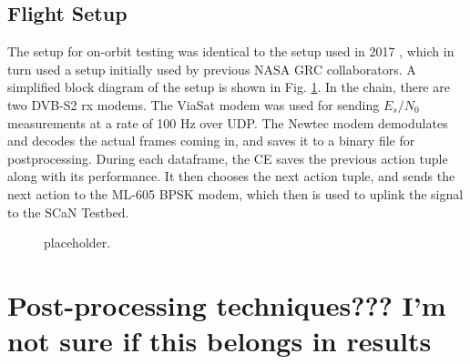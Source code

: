 \subsection{Flight Setup}
\par The setup for on-orbit testing was identical to the setup used in 2017 \cite{tim_implementation}, which in turn used a setup initially used by previous NASA GRC collaborators. A simplified block diagram of the setup is shown in Fig. \ref{methods:flightTestFig}. In the chain, there are two DVB-S2 rx modems. The ViaSat modem was used for sending $E_s/N_0$ measurements at a rate of 100 Hz over UDP. The Newtec modem demodulates and decodes the actual frames coming in, and saves it to a binary file for postprocessing. During each dataframe, the CE saves the previous action tuple along with its performance. It then chooses the next action tuple, and sends the next action to the ML-605 BPSK modem, which then is used to uplink the signal to the SCaN Testbed.

\begin{figure}[ht]
\caption{placeholder.}\label{methods:flightTestFig}
\end{figure} 

\section{Post-processing techniques??? I'm not sure if this belongs in results}
